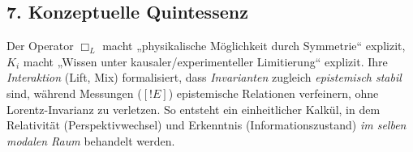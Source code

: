 \documentclass[10pt, letterpaper]{article}
\begin{document}
\subsection*{7. Konzeptuelle Quintessenz}
Der Operator $\Box_L$ macht „physikalische Möglichkeit durch Symmetrie“ explizit, $K_i$ macht „Wissen unter kausaler/experimenteller Limitierung“ explizit. Ihre \emph{Interaktion} (Lift, Mix) formalisiert, dass \emph{Invarianten} zugleich \emph{epistemisch stabil} sind, während Messungen ($[!E]$) epistemische Relationen verfeinern, ohne Lorentz-Invarianz zu verletzen. So entsteht ein einheitlicher Kalkül, in dem Relativität (Perspektivwechsel) und Erkenntnis (Informationszustand) \emph{im selben modalen Raum} behandelt werden.


\pagebreak
\printbibliography
\end{document}
